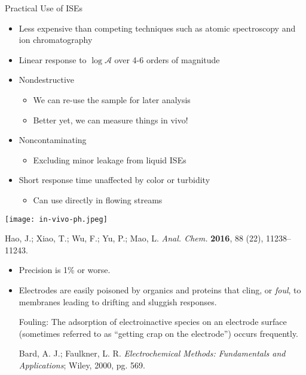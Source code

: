 \documentclass[notes=show]{beamer}
\begin{document}
\begin{frame}[allowframebreaks]{Practical Use of ISEs}
	\begin{itemize}
		\item Less expensive than competing techniques such as atomic
			spectroscopy and ion chromatography
		\item Linear response to $\log \mathcal{A}$ over 4-6 orders of
			magnitude
		\item Nondestructive 
			\begin{itemize}
				\item We can re-use the sample for later
					analysis
				\item Better yet, we can measure things in vivo!
			\end{itemize}
		\item Noncontaminating
			\begin{itemize}
				\item Excluding minor leakage from liquid ISEs
			\end{itemize}
		\item Short response time unaffected by color or turbidity
			\begin{itemize}
				\item Can use directly in flowing streams
			\end{itemize}
	\end{itemize}

	\framebreak

	\begin{center}
		\texttt{[image: in-vivo-ph.jpeg]}
	\end{center}

	{\footnotesize
	Hao, J.; Xiao, T.; Wu, F.; Yu, P.; Mao, L. \textit{Anal. Chem.}
	\textbf{2016}, 88 (22), 11238–11243.}

	\framebreak

	\begin{itemize}
		\item Precision is 1\% or worse.
		\item Electrodes are easily poisoned by organics and proteins
			that cling, or \emph{foul}, to membranes leading to
			drifting and sluggish responses.
			\begin{block}{Fouling:}
				The adsorption of electroinactive species on an
				electrode surface (sometimes referred to as
				``getting crap on the electrode'') occurs
				frequently.

				\medskip

				\footnotesize{Bard, A. J.; Faulkner, L.
					R.  \textit{Electrochemical Methods:
					Fundamentals and Applications}; Wiley,
				2000, pg. 569.}
			\end{block}
	\end{itemize}


\end{frame}
\end{document}

